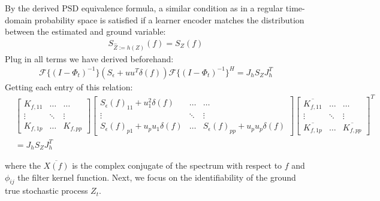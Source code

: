 \documentclass[10pt]{article}
\numberwithin{figure}{section}
\begin{document}
By the derived $\mathrm{PSD}$ equivalence formula, a similar condition as in a regular time-domain probability space is satisfied if a learner encoder matches the distribution between the estimated and ground variable:
\begin{align}
      S_{\hat Z:=h(Z)}(f) =  S_{Z}(f) \label{spr:6}
\end{align}
Plug in all terms we have derived beforehand:
\begin{align}
    \mathcal{F}\{(I-\Phi_t)^{-1}\}(S_{\epsilon}+uu^T\delta(f)) \mathcal{F}\{(I-\Phi_t)^{-1}\}^{H}= J_hS_{Z}J_h^{T}
\end{align}
Getting each entry of this relation:
\begin{align}
   & \left [
    \begin{array}{ccc}
    K_{f,11} &  \dots & \dots  \\
    \vdots &  \ddots & \vdots\\
   K_{f,1p} & \dots & K_{f,pp}
\end{array}
    \right]\left [
    \begin{array}{ccc}
   S_{\epsilon}(f)_{11}+u_1^2\delta(f) &  \dots & \dots  \\
    \vdots &  \ddots & \vdots\\
  S_{\epsilon}(f)_{p1}+u_pu_1\delta(f)& \dots & S_{\epsilon}(f)_{pp}+u_pu_p\delta(f)
\end{array}
    \right]\left [
    \begin{array}{ccc}
    \overline{ K_{f,11}} &  \dots & \dots  \\
    \vdots &  \ddots & \vdots\\
    \overline{K_{f,1p}} & \dots & \overline{K_{f,pp}}
\end{array}
    \right]^{T}\\
    &= J_hS_{Z}J_h^{T}\label{spr:7}
\end{align}

where the $\overline{X(f)} $ is the complex conjugate of the spectrum with respect to $f$  and $\phi_{ij}$ the filter kernel function. Next, we focus on the identifiability of the ground true stochastic process $Z_t$.
\end{document}

